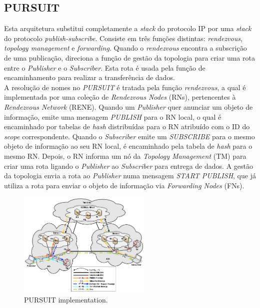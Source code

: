 \documentclass[conference]{IEEEtran}
\begin{document}
\subsection{PURSUIT}

Esta arquitetura substitui completamente a \textit{stack} do protocolo IP por uma \textit{stack} do protocolo \textit{publish-subscribe}. Consiste em tr\^{e}s fun\c{c}\~{o}es distintas: \textit{rendezvous}, \textit{topology management} e \textit{forwarding}.
Quando o \textit{rendezvous} encontra a subscri\c{c}\~{a}o de uma publica\c{c}\~{a}o, direciona a fun\c{c}\~{a}o de gest\~{a}o da topologia para criar uma rota entre o \textit{Publisher} e o \textit{Subscriber}. Esta rota \'{e} usada pela fun\c{c}\~{a}o de encaminhamento para realizar a transfer\^{e}ncia de dados.\\

A resolu\c{c}\~{a}o de nomes no \textit{PURSUIT} \'{e} tratada pela fun\c{c}\~{a}o \textit{rendezvous}, a qual \'{e} implementada por uma cole\c{c}\~{a}o de \textit{Rendezvous Nodes} (RNs), pertencentes \`{a} \textit{Rendezvous Network} (RENE). Quando um \textit{Publisher} quer anunciar um objeto de informa\c{c}\~{a}o, emite uma mensagem \textit{PUBLISH} para o RN local, o qual \'{e} encaminhado por tabelas de \textit{hash} distribu\'{i}das para o RN atribu\'{i}do com o ID do \textit{scope} correspondente. Quando o \textit{Subscriber} emite um \textit{SUBSCRIBE} para o mesmo objeto de informa\c{c}\~{a}o ao seu RN local, \'{e} encaminhado pela tabela de \textit{hash} para o mesmo RN. Depois, o RN informa um n\'{o} da \textit{Topology Management} (TM) para criar uma rota ligando o \textit{Publisher} ao \textit{Subscriber} para entrega de dados. A gest\~{a}o da topologia envia a rota ao \textit{Publisher} numa mensagem \textit{START PUBLISH}, que j\'{a} utiliza a rota para enviar o objeto de informa\c{c}\~{a}o via \textit{Forwarding Nodes} (FNs).\\

\begin{figure}[h]
\centering
\includegraphics[width=2.5in]{pursuit}
\caption{PURSUIT implementation.}
\label{pursuit}
\end{figure}
\end{document}
